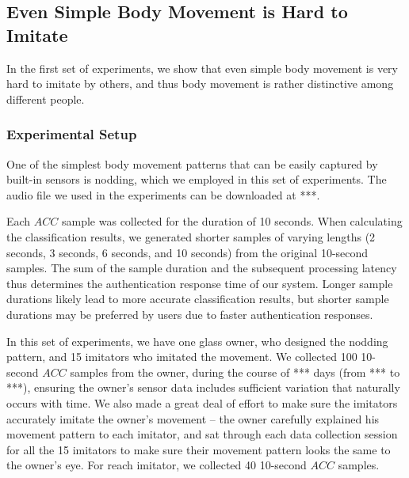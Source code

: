 \subsection{Even Simple Body Movement is Hard to Imitate}\label{sec:experimenr2}
In the first set of experiments, we show that even simple body movement is very hard to imitate by others, and thus body movement is rather distinctive among different people.

\subsubsection{Experimental Setup}
One of the simplest body movement patterns that can be easily captured by built-in sensors is nodding, which we employed in this set of experiments. The audio file we used in the experiments can be downloaded at ***.

Each $ACC$ sample was collected for the duration of 10 seconds. When calculating the classification results, we generated shorter samples of varying lengths (2 seconds, 3 seconds, 6 seconds, and 10 seconds) from the original 10-second samples. The sum of the sample duration and the subsequent processing latency thus determines the authentication response time of our system. Longer sample durations likely lead to more accurate classification results, but shorter sample durations may be preferred by users due to faster authentication responses.

In this set of experiments, we have one glass owner, who designed the nodding pattern,  and 15 imitators who imitated the movement. We collected 100 10-second $ACC$ samples from the owner, during the course of *** days (from *** to ***), ensuring the owner's sensor data includes sufficient variation that naturally occurs with time. We also made a great deal of effort to make sure the imitators accurately imitate the owner's movement -- the owner carefully explained his movement pattern to each imitator, and sat through each data collection session for all the 15 imitators to make sure their movement pattern looks the same to the owner's eye. For reach imitator, we collected 40 10-second $ACC$ samples.






